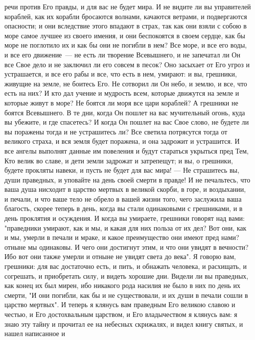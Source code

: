 речи против Его правды, и для вас не будет мира.
И не видите ли вы управителей кораблей, как их корабли бросаются
волнами, качаются ветрами, и подвергаются опасности; и они вследствие этого
впадают в страх, так как они взяли с собою в море самое лучшее из своего
имения, и они беспокоятся в своем сердце, как бы море не поглотило их и как бы
они не погибли в нем?
Все море, и все его воды, и все его движение~--- не есть ли творение
Всевышнего, и не запечатал ли Он все Свое дело и не заключил ли его совсем в
песок?
Оно засыхает от Его угроз и устрашается, и все его рабы и все, что
есть в нем, умирают: и вы, грешники, живущие на земле, не боитесь Его.
Не сотворил ли Он небо, и землю, и все, что есть на них?
И кто дал учение и мудрость всем, которые движутся на земле и которые
живут в море?
Не боятся ли моря все цари кораблей?
А грешники не боятся Всевышнего.
В те дни, когда Он пошлет на вас мучительный огонь, куда вы
убежите, и где спасетесь?
И когда Он пошлет на вас Свое слово, не будете ли вы поражены тогда и
не устрашитесь ли?
Все светила потрясутся тогда от великого страха, и вся земля будет
поражена, и она задрожит и устрашится.
И все ангелы выполнят данные им повеления и будут стараться укрыться
пред Тем, Кто велик во славе, и дети земли задрожат и затрепещут; и вы, о
грешники, будете прокляты навеки, и пусть не будет для вас мира!
--- Не страшитесь вы, души праведных, и уповайте на день своей смерти в
правде!
И не печальтесь, что ваша душа нисходит в царство мертвых в великой
скорби, в горе, и воздыхании, и печали, и что ваше тело не обрело в вашей жизни
того, чего заслужила ваша благость, скорее теперь в день, когда вы стали
одинаковыми с грешниками, и в день проклятия и осуждения.
И когда вы умираете, грешники говорят над вами: "праведники умирают,
как и мы, и какая для них польза от их дел?
Вот они, как и мы, умерли в печали и мраке, и какое преимущество они
имеют пред нами?
отныне мы одинаковы.
И чего они достигнут этим, и что они увидят в вечности?
Ибо вот они также умерли и отныне не увидят света до века".
Я говорю вам, грешники: для вас достаточно есть, и пить, и обнажать
человека, и расхищать, и согрешать, и приобретать силу, и видеть хорошие дни.
Видели ли вы праведных, как конец их был мирен, ибо никакого рода
насилия не было в них по день их смерти, "И они погибли, как бы и не
существовали, и их души в печали сошли в царство мертвых".
И теперь я клянусь вам праведным Его великою славою и честью, и
Его достохвальным царством, и Его владычеством я клянусь вам: я знаю эту тайну
и прочитал ее на небесных скрижалях, и видел книгу святых, и нашел написанное и
